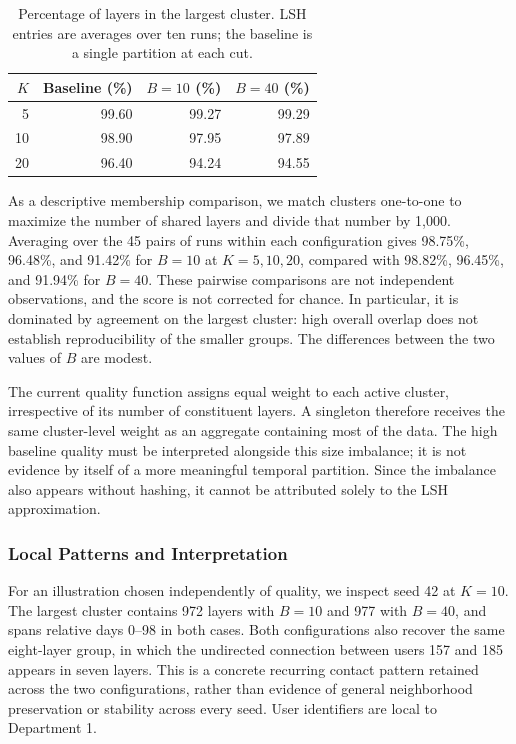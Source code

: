 \begin{table}[ht]
\centering
\begin{tabular}{rrrr}
\hline
$K$ & Baseline (\%) & $B=10$ (\%) & $B=40$ (\%) \\
\hline
5 & 99.60 & 99.27 & 99.29 \\
10 & 98.90 & 97.95 & 97.89 \\
20 & 96.40 & 94.24 & 94.55 \\
\hline
\end{tabular}
\caption{Percentage of layers in the largest cluster. LSH entries are averages over ten runs; the baseline is a single partition at each cut.}
\label{tab:dept1_largest_cluster}
\end{table}

As a descriptive membership comparison, we match clusters one-to-one to maximize the number of shared layers and divide that number by 1,000. Averaging over the 45 pairs of runs within each configuration gives 98.75\%, 96.48\%, and 91.42\% for $B=10$ at $K=5,10,20$, compared with 98.82\%, 96.45\%, and 91.94\% for $B=40$. These pairwise comparisons are not independent observations, and the score is not corrected for chance. In particular, it is dominated by agreement on the largest cluster: high overall overlap does not establish reproducibility of the smaller groups. The differences between the two values of $B$ are modest.

The current quality function assigns equal weight to each active cluster, irrespective of its number of constituent layers. A singleton therefore receives the same cluster-level weight as an aggregate containing most of the data. The high baseline quality must be interpreted alongside this size imbalance; it is not evidence by itself of a more meaningful temporal partition. Since the imbalance also appears without hashing, it cannot be attributed solely to the LSH approximation.

\subsubsection*{Local Patterns and Interpretation}
For an illustration chosen independently of quality, we inspect seed 42 at $K=10$. The largest cluster contains 972 layers with $B=10$ and 977 with $B=40$, and spans relative days 0--98 in both cases. Both configurations also recover the same eight-layer group, in which the undirected connection between users 157 and 185 appears in seven layers. This is a concrete recurring contact pattern retained across the two configurations, rather than evidence of general neighborhood preservation or stability across every seed. User identifiers are local to Department 1.

